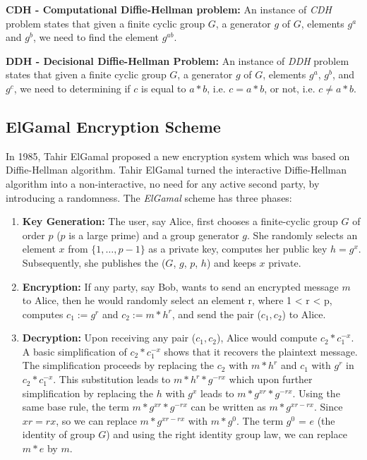       
      \textbf{CDH - Computational Diffie-Hellman problem:}
      An instance of \textit{CDH} problem   
      states that given a finite cyclic group $G$, a generator  $g$ of $G$, 
      elements $g^{a}$ and $g^{b}$,  we need to find the element $g^{ab}$.
      
      
      \textbf{DDH - Decisional Diffie-Hellman Problem:}
      An instance of \textit{DDH} problem states that given a finite cyclic group $G$, a generator $g$ of $G$,
      elements $g^{a}$, $g^{b}$, and $g^{c}$,  we need to determining if $c$ is equal to $a * b$, i.e. $c = a * b$, or not, i.e.  $c \neq a * b$.
      
           	 
     
     \subsection{ElGamal Encryption Scheme}
     \label{sec:elgamal}
     In 1985, Tahir ElGamal \citep{elgamal1985public} proposed a new encryption system which was based on Diffie-Hellman algorithm. 
     Tahir ElGamal turned the interactive  Diffie-Hellman algorithm into a non-interactive, no need for any active second party, by introducing 
     a randomness.  The \textit{ElGamal} scheme has three phases:
     \begin{enumerate}
		\item \textbf{Key Generation:}   
		The user, say Alice, first chooses a finite-cyclic group $G$ of order $p$ ($p$ is a large prime) and a group generator $g$.
		She randomly selects an element $x$ from $\{1, \ldots, p-1\}$ as a private key, computes her public key $h = g^{x}$. 
		Subsequently, she publishes 
		the ($G$, $g$, $p$, $h$) and keeps $x$ private. 
		\item \textbf{Encryption:}
		If any party, say Bob, wants to send an encrypted message $m$ to Alice, then he would randomly select an element 
		r, where 1 < r < p, computes $c_{1} := g^{r}$ and $c_{2} := m * h^{r}$, and send the pair ($c_{1}, c_{2}$) to 
		Alice. 
		\item \textbf{Decryption:}
		Upon receiving any pair ($c_{1}, c_{2}$), Alice would compute $c_{2} * c_{1}^{-x}$. A basic simplification of $c_{2} * c_{1}^{-x}$
		shows that it recovers the plaintext message. The simplification proceeds by replacing the $c_{2}$ with 
		$m*h^{r}$ and $c_{1}$ with $g^{r}$ in $c_{2} * c_{1}^{-x}$. This substitution leads to 
		$m * h ^ {r} * g^{-rx}$ which upon further simplification by replacing the $h$ with $g^{x}$
		leads to $m * g^{xr} * g^{-rx}$. Using the same base rule, the term $m * g^{xr} * g^{-rx}$ can be 
		written as $m * g^{xr - rx}$. Since $x  r = r x$, so we 
		can replace $m * g^{xr - rx}$ with $m * g^{0}$. The term $g^{0}$  = $e$ (the identity of group $G$) and using 
		the right identity group law, we can replace $m * e$ by $m$. 
		
	\end{enumerate}	
    
